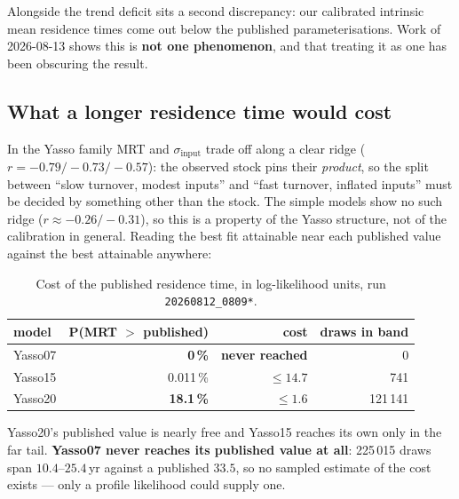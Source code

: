 \documentclass[11pt]{article}
\newcommand{\sinput}{\sigma_{\mathrm{input}}}
\begin{document}
Alongside the trend deficit sits a second discrepancy: our calibrated intrinsic mean residence times
come out below the published parameterisations. Work of 2026-08-13 shows this is \textbf{not one
phenomenon}, and that treating it as one has been obscuring the result.

\subsection*{What a longer residence time would cost}

In the Yasso family MRT and $\sinput$ trade off along a clear ridge ($r=-0.79/-0.73/-0.57$): the
observed stock pins their \emph{product}, so the split between ``slow turnover, modest inputs'' and
``fast turnover, inflated inputs'' must be decided by something other than the stock. The simple
models show no such ridge ($r\approx-0.26/-0.31$), so this is a property of the Yasso structure, not
of the calibration in general. Reading the best fit attainable near each published value against the
best attainable anywhere:

\begin{table}[H]\centering\small
\caption{Cost of the published residence time, in log-likelihood units, run \texttt{20260812\_0809*}.}
\begin{tabular}{lrrr}
\toprule
model & P(MRT $>$ published) & cost & draws in band\\
\midrule
Yasso07 & \textbf{0\,\%} & \textbf{never reached} & 0\\
Yasso15 & 0.011\,\% & $\le 14.7$ & 741\\
Yasso20 & \textbf{18.1\,\%} & $\le 1.6$ & 121\,141\\
\bottomrule
\end{tabular}
\end{table}

\noindent Yasso20's published value is nearly free and Yasso15 reaches its own only in the far tail.
\textbf{Yasso07 never reaches its published value at all}: 225\,015 draws span $10.4$--$25.4$\,yr
against a published $33.5$, so no sampled estimate of the cost exists --- only a profile likelihood
could supply one.
\end{document}
